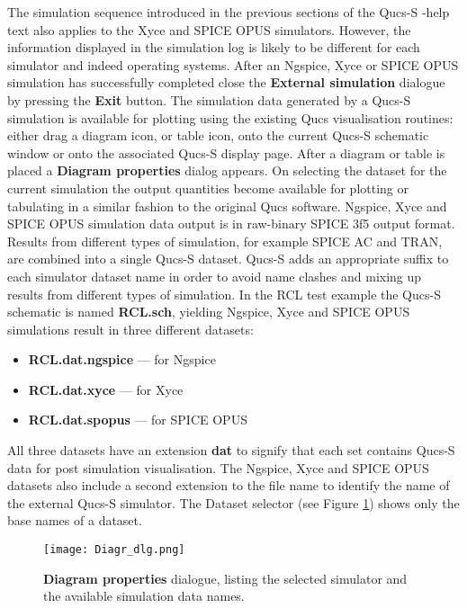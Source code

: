 \noindent The simulation sequence introduced in the previous sections of the Qucs-S -help text also applies to the Xyce and SPICE OPUS simulators. However, the information displayed in the simulation log is likely to be different for each simulator and indeed operating systems. After an Ngspice, Xyce or SPICE OPUS simulation has successfully completed close the \textbf{External simulation} dialogue by pressing the \textbf{Exit} button. The simulation data generated by a Qucs-S simulation is available for plotting using the existing Qucs visualisation routines: either drag a diagram icon, or table icon, onto the current Qucs-S schematic window or onto the associated Qucs-S display page. After a diagram or table is placed a \textbf{Diagram properties} dialog appears. On selecting the dataset for the current simulation the output quantities become available for plotting or tabulating in a similar fashion to the original Qucs software. Ngspice, Xyce and SPICE OPUS simulation data output is in raw-binary SPICE 3f5 output format. Results from different types of simulation, for example SPICE AC and TRAN, are combined into a single Qucs-S dataset.  Qucs-S adds an appropriate suffix to each simulator dataset name in order to avoid name clashes and mixing up results from different types of simulation. In the RCL test example the Qucs-S schematic is named \textbf{RCL.sch}, yielding Ngspice, Xyce and SPICE OPUS simulations result in three different datasets:

\begin{itemize}
	\item {\textbf{RCL.dat.ngspice} --- for Ngspice}
	\item {\textbf{RCL.dat.xyce}    --- for Xyce }
	\item {\textbf{RCL.dat.spopus}  --- for SPICE OPUS}
\end{itemize}

\noindent All three datasets have an extension \textbf{dat} to signify that each set contains Qucs-S data for post simulation visualisation. The Ngspice, Xyce and SPICE OPUS datasets also include a second extension to the file name to identify the name of the external Qucs-S simulator. The Dataset selector (see Figure \ref{Fig13}) shows only the base names of a dataset.

 \begin{figure}[h]
	\centering
	\texttt{[image: Diagr\_dlg.png]}
	\caption{\textbf{Diagram properties} dialogue, listing the selected simulator and the available simulation data names. }
	\label{Fig13}
\end{figure}

